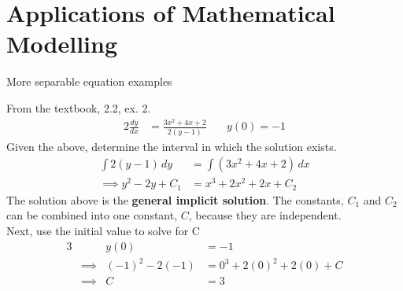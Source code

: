 \documentclass[twoside]{report}
\begin{document}
    \chapter{Applications of Mathematical Modelling}
    More separable equation examples
    \begin{example}
        From the textbook, 2.2, ex. 2.
        \begin{alignat}{2}
            \frac{dy}{dx}&=\frac{3x^2+4x+2}{2(y-1)} &\quad y(0) = -1
        \end{alignat}
        Given the above, determine the interval in which the solution exists.
        \begin{align}
            \int 2(y-1)\,dy&=\int (3x^{2} + 4x + 2)\,dx\\
            \implies y^2 - 2y + C_{1} &= x^3 + 2x^{2}+2x+C_2
        \end{align}
        The solution above is the \textbf{general implicit solution}. The constants, $C_{1}$ and $C_2$ can be combined into one constant, $C$, because they are independent.\\
        Next, use the initial value to solve for C
        \begin{alignat}{3}
            &&y(0) &= - 1\\
            &\implies & (-1)^{2} - 2(-1) &= 0^{3} + 2(0)^{2}+ 2(0) + C\\
            &\implies & C &= 3
        \end{alignat}
    \end{example}
    \np
\end{document}
